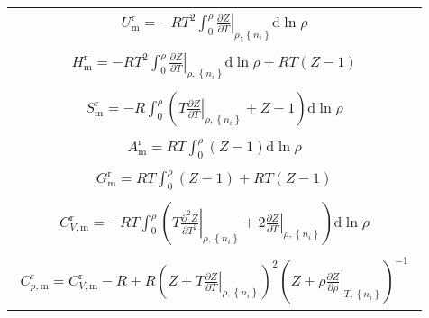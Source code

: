 \documentclass[main.tex]{subfiles}
\begin{document}
\begin{longtable}{m{}}
    \begin{align}U_\text{m}^\text{r}      =-RT^2\int_0^\rho\left.\frac{\partial Z}{\partial T}\right|_{\rho,\left\{n_i\right\}}\mathrm{d}\ln \rho\end{align}                                                                                                        \\[-8ex]
    \begin{align}H_\text{m}^\text{r}      =-RT^2\int_0^\rho\left.\frac{\partial Z}{\partial T}\right|_{\rho,\left\{n_i\right\}}\mathrm{d}\ln\rho+RT\left(Z-1\right)\end{align}                                                                                      \\[-8ex]
    \begin{align}S_\text{m}^\text{r}      =-R\int_0^\rho\left(T\left.\frac{\partial Z}{\partial T}\right|_{\rho,\left\{n_i\right\}}+Z-1\right)\mathrm{d}\ln\rho\end{align}                                                                                          \\[-8ex]
    \begin{align}A_\text{m}^\text{r}      =RT\int_0^\rho\left(Z-1\right)\mathrm{d}\ln\rho\end{align}                                                                                                                                                                \\[-8ex]
    \begin{align}G_\text{m}^\text{r}      =RT\int_0^\rho\left(Z-1\right)+RT\left(Z-1\right)\end{align}                                                                                                                                                              \\[-8ex]
    \begin{align}C_{V,\text{m}}^\text{r}  =-RT\int_0^\rho\left(T\left.\frac{\partial^2 Z}{\partial T^2}\right|_{\rho,\left\{n_i\right\}}+2\left.\frac{\partial Z}{\partial T}\right|_{\rho,\left\{n_i\right\}}\right)\mathrm{d}\ln\rho\end{align}                   \\[-8ex]
    \begin{align}C_{p,\text{m}}^\text{r}  =C_{V,\text{m}}^\text{r}-R+R\left(Z+T\left.\frac{\partial Z}{\partial T}\right|_{\rho,\left\{n_i\right\}}\right)^2\left(Z+\rho\left.\frac{\partial Z}{\partial \rho}\right|_{T,\left\{n_i\right\}}\right)^{-1}\end{align} \\
    \hline
\end{longtable}
\end{document}
